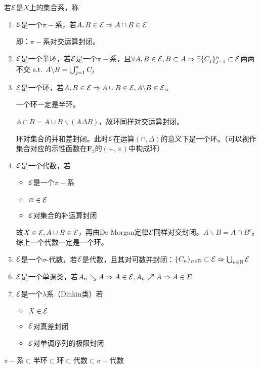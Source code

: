 \documentclass{ctexart}
\begin{document}
\begin{Def}
  若$\mathcal{E}$是$X$上的集合系，称
  \begin{enumerate}
  \item $\mathcal{E}$是一个$\pi-$系，若$A,B\in \mathcal{E}\Rightarrow A\cap B\in\mathcal{E}$

    即：$\pi-$系对交运算封闭。
  
  \item $\mathcal{E}$是一个半环，若$\mathcal{E}$是一个$\pi-$系，且$\forall A,B\in \mathcal{E}, B\subset A\Rightarrow \exists \{C_{j}\}_{j=1}^{n}\subset \mathcal{E}$两两不交$\text{ s.t. } A\backslash B=\bigcup_{j=1}^{n}C_{j}$
   
  \item $\mathcal{E}$是一个环，若$A,B\in\mathcal{E}\Rightarrow A\cup B\in \mathcal{E},A\backslash B\in \mathcal{E}$。

    一个环一定是半环。

    $A\cap B=A\cup B\backslash (A\Delta B)$，故环同样对交运算封闭。

    环对集合的并和差封闭。此时$\mathcal{E}$在运算$(\cap,\Delta)$的意义下是一个环。（可以视作集合对应的示性函数在$\mathbf{F}_{2}$的$(+,\times)$中构成环）
  \item $\mathcal{E}$是一个代数，若
    \begin{itemize}
    \item $\mathcal{E}$是一个$\pi-$系
    \item $\varnothing\in\mathcal{E}$
      
    \item $\mathcal{E}$对集合的补运算封闭
    \end{itemize}
    故$X\in\mathcal{E},A\cup B\in \mathcal{E}$，再由De Morgan定律$\mathcal{E}$同样对交封闭。$A\backslash B=A\cap B^{c}$。综上一个代数一定是一个环。
    
  \item $\mathcal{E}$是一个$\sigma$-代数，若$\mathcal{E}$是代数，且其对可数并封闭：$\{C_{n}\}_{n\in\mathbb{N}}\subset \mathcal{E}\Rightarrow\bigcup_{n\in\mathbb{N}}\mathcal{E}$
  \item $\mathcal{E}$是一个单调类，若$A_{n}\searrow A\Rightarrow A\in \mathcal{E},A_{n}\nearrow A\Rightarrow A\in E$
  \item $\mathcal{E}$是一个$\lambda$系（Dinkin类）若
    \begin{itemize}
    \item $X\in\mathcal{E}$
     
    \item $\mathcal{E}$对真差封闭
      
    \item $\mathcal{E}$对单调序列的极限封闭
    \end{itemize}
  \end{enumerate}
\end{Def}
$\pi-$系$\subset$半环$\subset$环$\subset $代数$\subset \sigma-$代数
\end{document}
